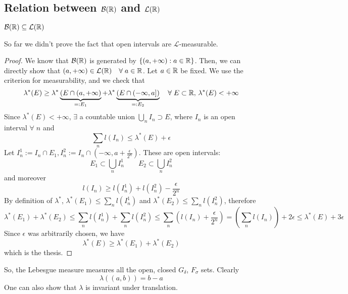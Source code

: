 \subsection{Relation between \texorpdfstring{\(\mathcal{B}(\mathbb{R})\)}{B(R)} and \texorpdfstring{\(\mathcal{L}(\mathbb{R})\)}{L(R)}}
\begin{proposition}
    \(\mathcal{B}(\mathbb{R}) \subseteq \mathcal{L}(\mathbb{R})\)
\end{proposition}
\begin{remark}
    So far we didn't prove the fact that open intervals are \(\mathcal{L}\)-measurable.
\end{remark}
\begin{proof}
    We know that \(\mathcal{B}(\mathbb{R})\) is generated by \(\left\lbrace (a, +\infty) : a \in \mathbb{R} \right\rbrace\). Then, we can directly show that \((a, +\infty) \in \mathcal{L}(\mathbb{R}) \quad \forall \; a \in \mathbb{R}\). Let \(a \in \mathbb{R}\) be fixed. We use the criterion for measurability, and we check that 
    \[
        \lambda^* (E) \geq \lambda^*\underbrace{(E \cap (a, +\infty)}_{=: E_1} + \lambda^*\underbrace{(E \cap (-\infty, a])}_{=:E_2} \quad \forall\; E \subset \mathbb{R}, \, \lambda^*(E) < +\infty
    \]
    Since \(\lambda^*(E) < +\infty\), \(\exists\) a countable union \(\bigcup_n I_n \supset E\), where \(I_n\) is an open interval \(\forall \; n\) and 
    \[
        \sum_n l(I_n) \leq \lambda^*(E) + \epsilon
    \]
    Let \(I^1_n := I_n \cap E_1, I^2_n := I_n \cap (-\infty, a + \frac{\epsilon}{2^n})\). These are open intervals:
    \[
        E_1 \subset \bigcup_n I^1_n \qquad E_2 \subset \bigcup_n I^2_n
    \tag*{countable unions}\]
    and moreover 
    \[
        l(I_n) \geq l(I^1_n) + l(I^2_n) - \frac{\epsilon}{2^n}
    \]
    By definition of \(\lambda^*\), \(\lambda^*(E_1) \leq \sum_n l(I^1_n)\) and \(\lambda^* (E_2) \leq \sum_n l(I^2_n)\), therefore 
    \[
        \lambda^*(E_1) + \lambda^*(E_2) \leq \sum_n l(I^1_n) + \sum_n l(I^2_n) \leq \sum_n \left(l(I_n) +\frac{\epsilon}{2^n}\right) = \left(\sum_n l(I_n)\right) + 2\epsilon \leq \lambda^*(E) + 3\epsilon
    \]
    Since \(\epsilon\) was arbitrarily chosen, we have
    \[
        \lambda^*(E) \geq \lambda^*(E_1) + \lambda^*(E_2)
    \]  
    which is the thesis.
\end{proof}
So, the Lebesgue measure measures all the open, closed \(G_{\delta}\), \(F_{\sigma}\) sets. Clearly
\[
    \lambda((a,b)) = b-a
\]
One can also show that \(\lambda\) is invariant under translation. 


